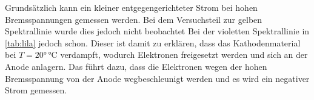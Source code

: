 Grundsätzlich kann ein kleiner entgegengerichteter Strom bei hohen Bremsspannungen gemessen werden. Bei dem Versuchsteil zur gelben Spektrallinie wurde dies jedoch nicht beobachtet 
Bei der violetten Spektrallinie in \autoref{tab:lila} jedoch schon. Dieser ist damit zu erklären, dass das Kathodenmaterial bei $T=20°\,\unit{\celsius}$ 
verdampft, wodurch Elektronen freigesetzt werden und sich an der Anode anlagern. Das führt dazu, dass die Elektronen wegen der hohen Bremsspannung von der 
Anode wegbeschleunigt werden und es wird ein negativer Strom gemessen.


